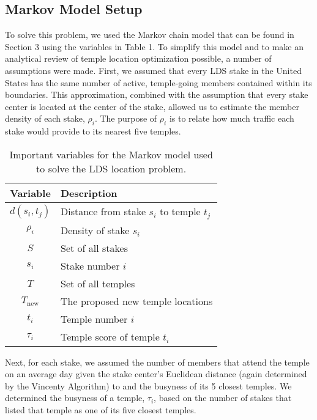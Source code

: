 \documentclass[twoside,twocolumn]{article}
\begin{document}
\subsection{Markov Model Setup}

To solve this problem, we used the Markov chain model that can be found in Section 3 using the variables in Table 1.
To simplify this model and to make an analytical review of temple location optimization possible, a number of assumptions were made.
First, we assumed that every LDS stake in the United States has the same number of active, temple-going members contained within its boundaries.
This approximation, combined with the assumption that every stake center is located at the center of the stake, allowed us to estimate the member density of each stake, $\rho_i$.
The purpose of $\rho_{i}$ is to relate how much traffic each stake would provide to its nearest five temples. %

\begin{table}
\begin{tabular}{c | l}
Variable & Description\\
\hline
$d(s_i,t_j)$ & Distance from stake $s_i$ to temple $t_j$\\
$\rho_i$ & Density of stake $s_i$\\
$S$ & Set of all stakes\\
$s_i$ & Stake number $i$\\
$T$ & Set of all temples\\
$T_{\text{new}}$ & The proposed new temple locations\\
$t_i$ & Temple number $i$ \\
$\tau_i$ & Temple score of temple $t_i$\\
\end{tabular}
\caption{Important variables for the Markov model used to solve the LDS location problem.}
\end{table}

Next, for each stake, we assumed the number of members that attend the temple on an average day given the stake center's Euclidean distance (again determined by the Vincenty Algorithm) to and the busyness of its 5 closest temples.
We determined the busyness of a temple, $\tau_i$, based on the number of stakes that listed that temple as one of its five closest temples. %
\end{document}
